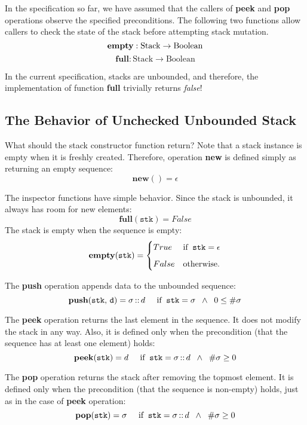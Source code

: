 \documentclass[10pt]{article}
\begin{document}
In the specification so far, we have assumed that the callers of {\textbf{peek}} and {\textbf{pop}} operations observe the specified preconditions. The following two functions allow callers to check the state of the stack before attempting stack mutation.
\[
\textbf{empty}: \mathrm{Stack} \rightarrow \mathrm{Boolean}\vspace*{4pt}\\
\]
\[
\textbf{full}: \mathrm{Stack} \rightarrow \mathrm{Boolean}
\]

\noindent In the current specification, stacks are unbounded, and therefore, the implementation of function {\textbf{full}} trivially returns \emph{false}!

\subsection{The Behavior of Unchecked Unbounded Stack}
What should the stack constructor function return? Note that a stack instance is empty when it is freshly created. Therefore, operation \textbf{new} is defined simply as returning an empty sequence:
\[
    \mathtt{\mathbf{new}()} = \epsilon
\]

The inspector functions have simple behavior. Since the stack is unbounded, it always has room for new elements:
\[
    \mathtt{\mathbf{full}(stk)} = False 
\]
\noindent The stack is empty when the sequence is empty:
\[
    \mathtt{\mathbf{empty}(stk)} = \begin{cases} True & \mbox{if\;\;} \mathtt{stk} = \epsilon \vspace*{6pt}\\ 
    False & \mbox{otherwise}. \end{cases} 
\]

The \textbf{push} operation appends data to the unbounded sequence:
\[
    \mathtt{\mathbf{push}(stk,\, d)} = \sigma \,\mathbf{::}\, d \;\;\;\;\; \mbox{if\;\;} \mathtt{stk} = \sigma \;\; \wedge \;\; 0 \leq \#\sigma
\]

The \textbf{peek} operation returns the last element in the sequence. It does not modify the stack in any way. Also, it is defined only when the precondition (that the sequence has at least one element) holds:
\[
    \mathtt{\mathbf{peek}(stk)} = d \;\;\;\;\; \mbox{if\;\;} \mathtt{stk} = \sigma \,\mathbf{::} \,d \;\; \wedge \;\; \#\sigma \geq 0
\]

The \textbf{pop} operation returns the stack after removing  the topmost element. It is defined only when the precondition (that the sequence is non-empty) holds, just as in the case of \textbf{peek} operation:
\[
    \mathtt{\mathbf{pop}(stk)} = \sigma \;\;\;\;\; \mbox{if\;\;} \mathtt{stk} = \sigma \,\mathbf{::} \,d \;\; \wedge \;\; \#\sigma \geq 0
\]
\end{document}

